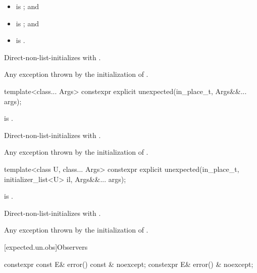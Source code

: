 \begin{itemdescr}
\pnum
\constraints
\begin{itemize}
\item
{} is ; and
\item
{} is ; and
\item
{} is .
\end{itemize}

\pnum
\effects
Direct-non-list-initializes  with .

\pnum
\throws
Any exception thrown by the initialization of .
\end{itemdescr}

%
\begin{itemdecl}
template<class... Args>
  constexpr explicit unexpected(in_place_t, Args&&... args);
\end{itemdecl}

\begin{itemdescr}
\pnum
\constraints
{} is .

\pnum
\effects
Direct-non-list-initializes
 with .

\pnum
\throws
Any exception thrown by the initialization of .
\end{itemdescr}

%
\begin{itemdecl}
template<class U, class... Args>
  constexpr explicit unexpected(in_place_t, initializer_list<U> il, Args&&... args);
\end{itemdecl}

\begin{itemdescr}
\pnum
\constraints
{} is .

\pnum
\effects
Direct-non-list-initializes
 with .

\pnum
\throws
Any exception thrown by the initialization of .
\end{itemdescr}

[expected.un.obs]{Observers}

%
\begin{itemdecl}
constexpr const E& error() const & noexcept;
constexpr E& error() & noexcept;
\end{itemdecl}

